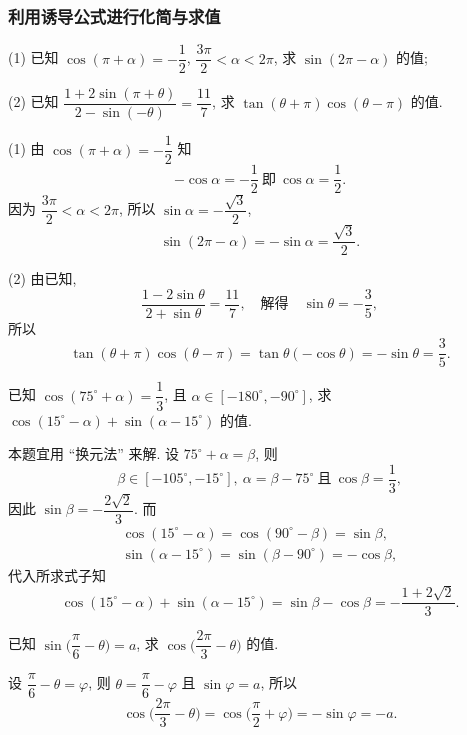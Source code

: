 \subsubsection{利用诱导公式进行化简与求值}
\begin{example}
    (1) 已知 $\cos(\pi+\alpha)= -\dfrac12$, $\dfrac{3\pi}2< \alpha< 2\pi$, 
    求 $\sin(2\pi-\alpha)$ 的值;
    
    (2) 已知 $\dfrac{1+2\sin(\pi+\theta)}{2-\sin(-\theta)}= \dfrac{11}7$, 
    求 $\tan(\theta+\pi)\cos(\theta-\pi)$ 的值.
\end{example}
\beginsolution
    (1) 由 $\cos(\pi+\alpha)= -\dfrac12$ 知
    \[-\cos\alpha= -\dfrac12\ \text{即}\ 
    \cos\alpha= \dfrac12.\]
    因为 $\dfrac{3\pi}2< \alpha< 2\pi$, 
    所以 $\sin\alpha= -\dfrac{\sqrt3}2$,
    \[\sin(2\pi-\alpha)= -\sin\alpha= \frac{\sqrt3}{2}.\]

    (2) 由已知,
    \[\dfrac{1-2\sin\theta}{2+\sin\theta}= \dfrac{11}7,
        \quad\text{解得}\quad
        \sin\theta= -\frac35,\]
    所以
    \[\tan(\theta+\pi)\cos(\theta-\pi)
        = \tan\theta(-\cos\theta)
        = -\sin\theta= \frac35.\]
\endsolution

\begin{example}
    已知 $\cos(75^\circ+\alpha)= \dfrac13$, 且 $\alpha\in[-180^\circ,-90^\circ]$, 求 $\cos(15^\circ-\alpha)+ \sin(\alpha-15^\circ)$ 的值.
\end{example}
\beginsolution
    本题宜用 ``换元法'' 来解. 设 $75^\circ+\alpha= \beta$, 
    则
    \[\beta\in[-105^\circ,-15^\circ],\ 
        \alpha= \beta- 75^\circ\ \text{且}\ 
        \cos\beta= \frac13,\]
    因此 $\sin\beta= -\dfrac{2\sqrt2}3$. 而
    \[\begin{gathered}
        \cos(15^\circ-\alpha)= \cos(90^\circ- \beta)= \sin\beta,\\
        \sin(\alpha-15^\circ)= \sin(\beta- 90^\circ)= -\cos\beta,
    \end{gathered}\]
    代入所求式子知
    \[\cos(15^\circ-\alpha)+ \sin(\alpha-15^\circ)
        = \sin\beta- \cos\beta= -\frac{1+2\sqrt2}{3}.\]
\endsolution

\lianxi
\begin{exercise}
    已知 $\sin\biggl(\dfrac\pi6- \theta\biggr)=a$, 
    求 $\cos\biggl(\dfrac{2\pi}3-\theta\biggr)$ 的值.
\end{exercise}
\beginsolution
    设 $\dfrac\pi6- \theta= \varphi$, 则 $\theta= \dfrac\pi6- \varphi$ 且 $\sin\varphi= a$, 所以
    \[\cos\biggl(\dfrac{2\pi}3-\theta\biggr)
        = \cos\biggl(\frac\pi2+\varphi\biggr)
        = -\sin\varphi= -a.\]
\endsolution

